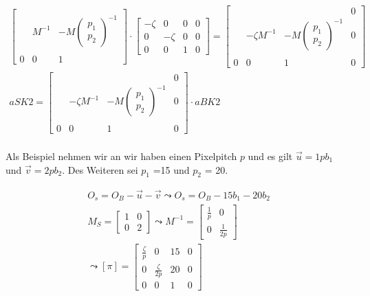 \begin{gather}
\begin{bmatrix}
&&\\
&M^{-1}& -M\begin{pmatrix}p_1\\p_2\end{pmatrix}^{-1}\\
&&\\
0&0&1
\end{bmatrix}
\cdot
\begin{bmatrix}
-\zeta&0&0&0\\
0&-\zeta&0&0\\
0&0&1&0
\end{bmatrix}
=
\begin{bmatrix}
&&&0\\
&-\zeta M^{-1}& -M\begin{pmatrix}p_1\\p_2\end{pmatrix}^{-1}&0\\
&&&\\
0&0&1&0
\end{bmatrix}\\
aSK2 = 
\begin{bmatrix}
&&&0\\
&-\zeta M^{-1}& -M\begin{pmatrix}p_1\\p_2\end{pmatrix}^{-1}&0\\
&&&\\
0&0&1&0
\end{bmatrix} 
\cdot
aBK2
\end{gather}\\

Als Beispiel nehmen wir an wir haben einen Pixelpitch \ensuremath{p} und es gilt \ensuremath{\vec{u} = 1pb_1} und \ensuremath{\vec{v}=2pb_2}. Des Weiteren sei \ensuremath{p_1} =15 und \ensuremath{p_2} = 20.

\begin{gather}
O_s = O_B - \vec{u}-\vec{v} \leadsto O_s = O_B-15b_1-20b_2\\
M_S = \begin{bmatrix}
1&0\\
0&2
\end{bmatrix} \leadsto M^{-1} =
\begin{bmatrix}
\frac{1}{p}&0\\
0&\frac{1}{2p}
\end{bmatrix}\\
\leadsto [\pi]=
\begin{bmatrix}
\frac{\zeta}{p}&0&15&0\\
0&\frac{\zeta}{2p}&20&0\\
0&0&1&0
\end{bmatrix}\\
\end{gather} 



